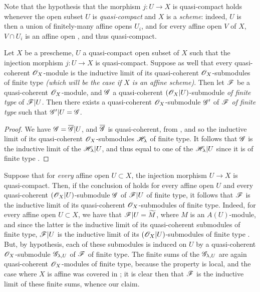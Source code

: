 Note that the hypothesis that the morphism $j:U\to X$ is quasi-compact
holds whenever the open subset $U$ is \emph{quasi-compact} and $X$ is a
\emph{scheme}: indeed, $U$ is then a union of finitely-many affine opens $U_i$,
and for every affine open $V$ of $X$, $V\cap U_i$ is an affine open , and
thus quasi-compact.

\begin{cor}[9.4.3]
\label{1.9.4.3}
Let $X$ be a prescheme, $U$ a quasi-compact open subset of $X$ such that the injection
morphism $j:U\to X$ is quasi-compact. Suppose as well that every quasi-coherent
$\mathscr{O}_X$-module is the inductive limit of its quasi-coherent $\mathscr{O}_X$-submodules of finite type
\emph{(which will be the case if $X$ is an \emph{affine scheme})}. Then let $\mathscr{F}$ be a
quasi-coherent $\mathscr{O}_X$-module, and $\mathscr{G}$ a quasi-coherent $(\mathscr{O}_X|U)$-submodule \emph{of
finite type} of $\mathscr{F}|U$. Then there exists a quasi-coherent $\mathscr{O}_X$-submodule $\mathscr{G}'$ of
$\mathscr{F}$ \emph{of finite type} such that $\mathscr{G}'|U=\mathscr{G}$.
\end{cor}

\begin{proof}
\label{proof-1.9.4.3}
We have $\mathscr{G}=\overline{\mathscr{G}}|U$, and $\overline{\mathscr{G}}$ is quasi-coherent, from
, and so the inductive limit of its quasi-coherent $\mathscr{O}_X$-submodules
$\mathscr{H}_\lambda$ of finite type. It follows that $\mathscr{G}$ is the inductive limit of the
$\mathscr{H}_\lambda|U$, and thus equal to one of the $\mathscr{H}_\lambda|U$ since it is of finite
type .
\end{proof}

\begin{rmk}[9.4.4]
\label{1.9.4.4}
Suppose that for \emph{every} affine open $U\subset X$, the injection morphism $U\to X$ is
quasi-compact. Then, if the conclusion of  holds for every affine open $U$
and every quasi-coherent $(\mathscr{O}_X|U)$-submodule $\mathscr{G}$ of $\mathscr{F}|U$ of finite type, it
follows
that $\mathscr{F}$ is the inductive limit of its quasi-coherent $\mathscr{O}_X$-submodules of finite type.
Indeed, for every affine open $U\subset X$, we have that $\mathscr{F}|U=\widetilde{M}$, where $M$
is an $A(U)$-module, and since the latter is the inductive limit of its quasi-coherent
submodules of finite type, $\mathscr{F}|U$ is the inductive limit of its $(\mathscr{O}_X|U)$-submodules of
finite type . But, by hypothesis, each of these submodules is induced on $U$
by a quasi-coherent $\mathscr{O}_X$-submodule $\mathscr{G}_{\lambda,U}$ of $\mathscr{F}$ of finite type. The
finite sums of the $\mathscr{G}_{\lambda,U}$ are again quasi-coherent $\mathscr{O}_X$-modules of finite
type, because the property is local, and the case where $X$ is affine was covered in
; it is clear then that $\mathscr{F}$ is the inductive limit of these finite
sums, whence our claim.
\end{rmk}

